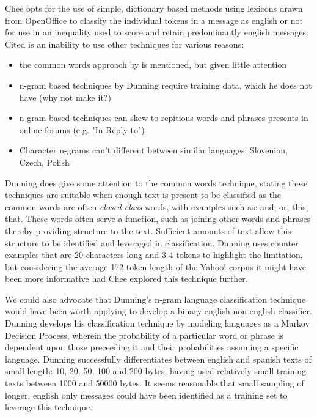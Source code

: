 \documentclass[twoside,11pt]{article}
\begin{document}
Chee opts for the use of simple, dictionary based methods using lexicons drawn from OpenOffice to classify the individual tokens in a message as english or not for use in an inequality used to score and retain predominantly english messages. Cited is an inability to use other techniques for various reasons:
\begin{itemize}
  \item the common words approach by \citep{Ingle, 1976} is mentioned, but given little attention
  \item n-gram based techniques by Dunning \citep{Dunning} require training data, which he does not have (why not make it?)
  \item n-gram based techniques can skew to repitious words and phrases presents in online forums (e.g. "In Reply to")
  \item Character n-grams can't different between similar languages: Slovenian, Czech, Polish
\end{itemize}

Dunning \citep{Dunning} does give some attention to the common words technique, stating these techniques are suitable when enough text is present to be classified as the common words are often \textit{closed class} words, with examples such as: and, or, this, that. These words often serve a function, such as joining other words and phrases thereby providing structure to the text. Sufficient amounts of text allow this structure to be identified and leveraged in classification. Dunning uses counter examples that are 20-characters long and 3-4 tokens to highlight the limitation, but considering the average 172 token length of the Yahoo! corpus it might have been more informative had Chee explored this technique further.

We could also advocate that Dunning's n-gram language classification technique would have been worth applying to develop a binary english-non-english classifier. Dunning develops his classification technique by modeling languages as a Markov Decision Process, wherein the probability of a particular word or phrase is dependent upon those preceeding it and their probabilities assuming a specific language. Dunning successfully differentiates between english and spanish texts of small length: 10, 20, 50, 100 and 200 bytes, having used relatively small training texts between 1000 and 50000 bytes. It seems reasonable that small sampling of longer, english only messages could have been identified as a training set to leverage this technique.
\end{document}
